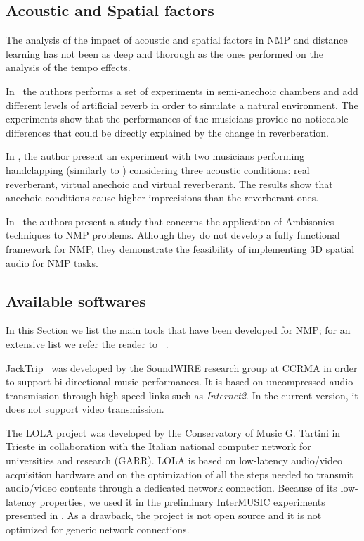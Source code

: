 \documentclass[conference]{IEEEtran}
\begin{document}
\subsection{Acoustic and Spatial factors}\label{subsec:acoustics}
The analysis of the impact of acoustic and spatial factors in NMP and distance learning has not been as deep and thorough as the ones performed on the analysis of the tempo effects. 

In~\cite{carot2009towards} the authors performs a set of experiments in semi-anechoic chambers and add different levels of artificial reverb in order to simulate a natural environment. The experiments show that the performances of the musicians provide no noticeable differences that could be directly explained by the change in reverberation. 

In \cite{FarnerReverb}, the author present an experiment with two musicians performing handclapping (similarly to \cite{Chafe1}) considering three acoustic conditions: real reverberant, virtual anechoic and virtual reverberant. The results show that anechoic conditions cause higher imprecisions than the reverberant ones.

In~\cite{gurevich2011ambisonic} the authors present a study that concerns the application of Ambisonics techniques to NMP problems. Athough they do not develop a fully functional framework for NMP, they demonstrate the feasibility of implementing 3D spatial audio for NMP tasks. %


\subsection{Available softwares}\label{subsec:sw}
In this Section we list the main tools that have been developed for NMP; for an extensive list we refer the reader to ~\cite{RottondiOverview}.

JackTrip~\cite{CaceresJacktrip} was developed by the SoundWIRE research group at CCRMA in order to support bi-directional music performances. It is based on uncompressed audio transmission through high-speed links such as \textit{Internet2}. In the current version, it does not support video transmission.

The LOLA\cite{drioli2013networked} project was developed by the Conservatory of Music G. Tartini in Trieste in collaboration with the Italian national computer network for universities and research (GARR). LOLA is based on low-latency audio/video acquisition hardware and on the optimization of all the steps needed to transmit audio/video contents through a dedicated network connection. Because of  its low-latency properties, we used it in the preliminary InterMUSIC experiments presented in \cite{CIM2018}. As a drawback, the project is not open source and it is not optimized for generic network connections.
\end{document}
